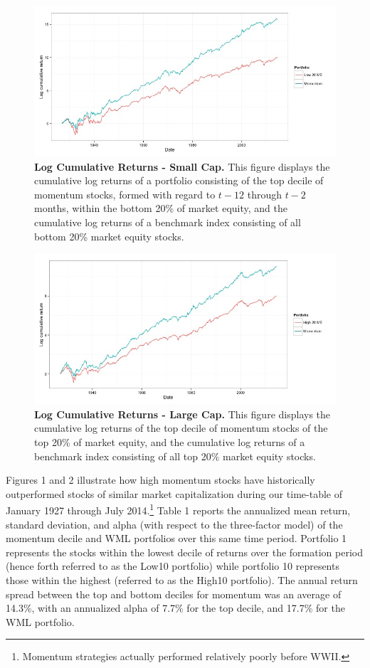 \documentclass[12pt]{article}
\begin{document}
\begin{figure}[p]%
\centering
\caption{\textbf{Log Cumulative Returns - Small Cap.} {\footnotesize This figure displays the cumulative log returns of a portfolio consisting of the top decile of momentum stocks, formed with regard to $t-12$ through $t-2$ months, within the bottom 20\% of market equity, and the cumulative log returns of a benchmark index consisting of all bottom 20\% market equity stocks.}}
\includegraphics[scale=0.52]{Figures/01-Lo20.JPEG}
\end{figure}
\begin{figure}[p]
\centering
\caption{\textbf{Log Cumulative Returns - Large Cap.} {\footnotesize This figure displays the cumulative log returns of the top decile of momentum stocks of the top 20\% of market equity, and the cumulative log returns of a benchmark index consisting of all top 20\% market equity stocks.}}
\includegraphics[scale=0.52]{Figures/02-Hi20.JPEG}
\end{figure}

Figures 1 and 2 illustrate how high momentum stocks have historically outperformed stocks of similar market capitalization during our time-table of January 1927 through July 2014.\footnote{Momentum strategies actually performed relatively poorly before WWII.} Table 1 reports the annualized mean return, standard deviation, and alpha (with respect to the three-factor model) of the momentum decile and WML portfolios over this same time period. Portfolio 1 represents the stocks within the lowest decile of returns over the formation period (hence forth referred to as the Low10 portfolio) while portfolio 10 represents those within the highest (referred to as the High10 portfolio). The annual return spread between the top and bottom deciles for momentum was an average of 14.3\%, with an annualized alpha of 7.7\% for the top decile, and 17.7\% for the WML portfolio. 
\end{document}
